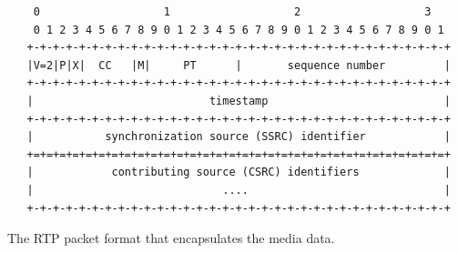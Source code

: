 
\begin{figure}[!h]
\begin{spacing}{0.5}
\centering
{\small
\begin{verbatim}
    0                   1                   2                   3
    0 1 2 3 4 5 6 7 8 9 0 1 2 3 4 5 6 7 8 9 0 1 2 3 4 5 6 7 8 9 0 1
   +-+-+-+-+-+-+-+-+-+-+-+-+-+-+-+-+-+-+-+-+-+-+-+-+-+-+-+-+-+-+-+-+
   |V=2|P|X|  CC   |M|     PT      |       sequence number         |
   +-+-+-+-+-+-+-+-+-+-+-+-+-+-+-+-+-+-+-+-+-+-+-+-+-+-+-+-+-+-+-+-+
   |                           timestamp                           |
   +-+-+-+-+-+-+-+-+-+-+-+-+-+-+-+-+-+-+-+-+-+-+-+-+-+-+-+-+-+-+-+-+
   |           synchronization source (SSRC) identifier            |
   +=+=+=+=+=+=+=+=+=+=+=+=+=+=+=+=+=+=+=+=+=+=+=+=+=+=+=+=+=+=+=+=+
   |            contributing source (CSRC) identifiers             |
   |                             ....                              |
   +-+-+-+-+-+-+-+-+-+-+-+-+-+-+-+-+-+-+-+-+-+-+-+-+-+-+-+-+-+-+-+-+
\end{verbatim}
}
\end{spacing}
\caption{The RTP packet format that encapsulates the media data.}
\label{fig:3:rtp.hdr}
\end{figure}


